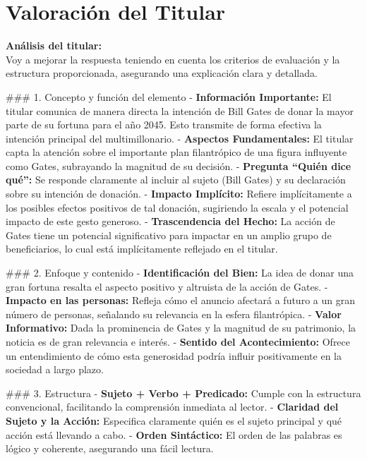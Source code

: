 \documentclass[10pt,a4paper]{article}
\begin{document}
\section*{Valoración del Titular}
        \textbf{Análisis del titular:} \\ 
        Voy a mejorar la respuesta teniendo en cuenta los criterios de evaluaci\'{o}n y la estructura proporcionada, asegurando una explicaci\'{o}n clara y detallada.
\par\medskip
\#\#\# 1. Concepto y funci\'{o}n del elemento - \textbf{Informaci\'{o}n Importante:} El titular comunica de manera directa la intenci\'{o}n de Bill Gates de donar la mayor parte de su fortuna para el a\~{n}o 2045. Esto transmite de forma efectiva la intenci\'{o}n principal del multimillonario. - \textbf{Aspectos Fundamentales:} El titular capta la atenci\'{o}n sobre el importante plan filantr\'{o}pico de una figura influyente como Gates, subrayando la magnitud de su decisi\'{o}n. - \textbf{Pregunta ``Qui\'{e}n dice qu\'{e}'':} Se responde claramente al incluir al sujeto (Bill Gates) y su declaraci\'{o}n sobre su intenci\'{o}n de donaci\'{o}n. - \textbf{Impacto Impl\'{i}cito:} Refiere impl\'{i}citamente a los posibles efectos positivos de tal donaci\'{o}n, sugiriendo la escala y el potencial impacto de este gesto generoso. - \textbf{Trascendencia del Hecho:} La acci\'{o}n de Gates tiene un potencial significativo para impactar en un amplio grupo de beneficiarios, lo cual est\'{a} impl\'{i}citamente reflejado en el titular.
\par\medskip
\#\#\# 2. Enfoque y contenido - \textbf{Identificaci\'{o}n del Bien:} La idea de donar una gran fortuna resalta el aspecto positivo y altruista de la acci\'{o}n de Gates. - \textbf{Impacto en las personas:} Refleja c\'{o}mo el anuncio afectar\'{a} a futuro a un gran n\'{u}mero de personas, se\~{n}alando su relevancia en la esfera filantr\'{o}pica. - \textbf{Valor Informativo:} Dada la prominencia de Gates y la magnitud de su patrimonio, la noticia es de gran relevancia e inter\'{e}s. - \textbf{Sentido del Acontecimiento:} Ofrece un entendimiento de c\'{o}mo esta generosidad podr\'{i}a influir positivamente en la sociedad a largo plazo.
\par\medskip
\#\#\# 3. Estructura - \textbf{Sujeto + Verbo + Predicado:} Cumple con la estructura convencional, facilitando la comprensi\'{o}n inmediata al lector. - \textbf{Claridad del Sujeto y la Acci\'{o}n:} Especifica claramente qui\'{e}n es el sujeto principal y qu\'{e} acci\'{o}n est\'{a} llevando a cabo. - \textbf{Orden Sint\'{a}ctico:} El orden de las palabras es l\'{o}gico y coherente, asegurando una f\'{a}cil lectura.
\end{document}
